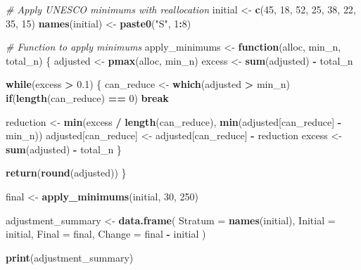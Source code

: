 \documentclass[
]{article}
\newenvironment{Shaded}{\begin{snugshade}}{\end{snugshade}}
\newcommand{\AttributeTok}[1]{\textcolor[rgb]{0.13,0.29,0.53}{#1}}
\newcommand{\CommentTok}[1]{\textcolor[rgb]{0.56,0.35,0.01}{\textit{#1}}}
\newcommand{\ControlFlowTok}[1]{\textcolor[rgb]{0.13,0.29,0.53}{\textbf{#1}}}
\newcommand{\DecValTok}[1]{\textcolor[rgb]{0.00,0.00,0.81}{#1}}
\newcommand{\FloatTok}[1]{\textcolor[rgb]{0.00,0.00,0.81}{#1}}
\newcommand{\FunctionTok}[1]{\textcolor[rgb]{0.13,0.29,0.53}{\textbf{#1}}}
\newcommand{\NormalTok}[1]{#1}
\newcommand{\OtherTok}[1]{\textcolor[rgb]{0.56,0.35,0.01}{#1}}
\newcommand{\SpecialCharTok}[1]{\textcolor[rgb]{0.81,0.36,0.00}{\textbf{#1}}}
\newcommand{\StringTok}[1]{\textcolor[rgb]{0.31,0.60,0.02}{#1}}
\begin{document}
\begin{Shaded}
\begin{Highlighting}[]
\CommentTok{\# Apply UNESCO minimums with reallocation}
\NormalTok{initial }\OtherTok{\textless{}{-}} \FunctionTok{c}\NormalTok{(}\DecValTok{45}\NormalTok{, }\DecValTok{18}\NormalTok{, }\DecValTok{52}\NormalTok{, }\DecValTok{25}\NormalTok{, }\DecValTok{38}\NormalTok{, }\DecValTok{22}\NormalTok{, }\DecValTok{35}\NormalTok{, }\DecValTok{15}\NormalTok{)}
\FunctionTok{names}\NormalTok{(initial) }\OtherTok{\textless{}{-}} \FunctionTok{paste0}\NormalTok{(}\StringTok{"S"}\NormalTok{, }\DecValTok{1}\SpecialCharTok{:}\DecValTok{8}\NormalTok{)}

\CommentTok{\# Function to apply minimums}
\NormalTok{apply\_minimums }\OtherTok{\textless{}{-}} \ControlFlowTok{function}\NormalTok{(alloc, min\_n, total\_n) \{}
\NormalTok{  adjusted }\OtherTok{\textless{}{-}} \FunctionTok{pmax}\NormalTok{(alloc, min\_n)}
\NormalTok{  excess }\OtherTok{\textless{}{-}} \FunctionTok{sum}\NormalTok{(adjusted) }\SpecialCharTok{{-}}\NormalTok{ total\_n}
  
  \ControlFlowTok{while}\NormalTok{(excess }\SpecialCharTok{\textgreater{}} \FloatTok{0.1}\NormalTok{) \{}
\NormalTok{    can\_reduce }\OtherTok{\textless{}{-}} \FunctionTok{which}\NormalTok{(adjusted }\SpecialCharTok{\textgreater{}}\NormalTok{ min\_n)}
    \ControlFlowTok{if}\NormalTok{(}\FunctionTok{length}\NormalTok{(can\_reduce) }\SpecialCharTok{==} \DecValTok{0}\NormalTok{) }\ControlFlowTok{break}
    
\NormalTok{    reduction }\OtherTok{\textless{}{-}} \FunctionTok{min}\NormalTok{(excess }\SpecialCharTok{/} \FunctionTok{length}\NormalTok{(can\_reduce), }
                    \FunctionTok{min}\NormalTok{(adjusted[can\_reduce] }\SpecialCharTok{{-}}\NormalTok{ min\_n))}
\NormalTok{    adjusted[can\_reduce] }\OtherTok{\textless{}{-}}\NormalTok{ adjusted[can\_reduce] }\SpecialCharTok{{-}}\NormalTok{ reduction}
\NormalTok{    excess }\OtherTok{\textless{}{-}} \FunctionTok{sum}\NormalTok{(adjusted) }\SpecialCharTok{{-}}\NormalTok{ total\_n}
\NormalTok{  \}}
  
  \FunctionTok{return}\NormalTok{(}\FunctionTok{round}\NormalTok{(adjusted))}
\NormalTok{\}}

\NormalTok{final }\OtherTok{\textless{}{-}} \FunctionTok{apply\_minimums}\NormalTok{(initial, }\DecValTok{30}\NormalTok{, }\DecValTok{250}\NormalTok{)}

\NormalTok{adjustment\_summary }\OtherTok{\textless{}{-}} \FunctionTok{data.frame}\NormalTok{(}
  \AttributeTok{Stratum =} \FunctionTok{names}\NormalTok{(initial),}
  \AttributeTok{Initial =}\NormalTok{ initial,}
  \AttributeTok{Final =}\NormalTok{ final,}
  \AttributeTok{Change =}\NormalTok{ final }\SpecialCharTok{{-}}\NormalTok{ initial}
\NormalTok{)}

\FunctionTok{print}\NormalTok{(adjustment\_summary)}
\end{Highlighting}
\end{Shaded}
\end{document}
